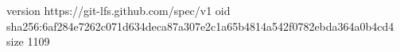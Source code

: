version https://git-lfs.github.com/spec/v1
oid sha256:6af284e7262c071d634deca87a307e2c1a65b4814a542f0782ebda364a0b4cd4
size 1109
